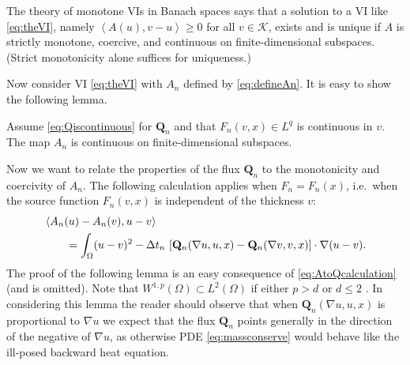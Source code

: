 \documentclass[final,onefignum]{siamart190516}
\newcommand\bQ{\mathbf{Q}}
\newcommand{\grad}{\nabla}
\newcommand{\ip}[2]{\ensuremath{\left<#1,#2\right>}}
\newcommand\RR{\mathbb{R}}
\begin{document}
The theory of monotone VIs in Banach spaces \cite[chapter III]{KinderlehrerStampacchia1980} says that a solution to a VI like \eqref{eq:theVI}, namely $\ip{A(u)}{v-u} \ge 0$ for all $v\in\mathcal{K}$, exists and is unique if $A$ is strictly monotone, coercive, and continuous on finite-dimensional subspaces.  (Strict monotonicity alone suffices for uniqueness.)

Now consider VI \eqref{eq:theVI} with $A_n$ defined by \eqref{eq:defineAn}.  It is easy to show the following lemma.

\begin{lemma}  \label{lem:continuous}  Assume \eqref{eq:Qiscontinuous} for $\bQ_n$ and that $F_n(v,x)\in L^q$ is continuous in $v$.  The map $A_n$ is continuous on finite-dimensional subspaces.
\end{lemma}


Now we want to relate the properties of the flux $\bQ_n$ to the monotonicity and coercivity of $A_n$.  The following calculation applies when $F_n=F_n(x)$, i.e.~when the source function $F_n(v,x)$ is independent of the thickness $v$:
\begin{align}
   &\ip{A_n(u) - A_n(v)}{u-v}  \label{eq:AtoQcalculation} \\
   &\qquad = \int_\Omega (u-v)^2 - \Delta t_n\, \left[\bQ_n(\grad u,u,x) - \bQ_n(\grad v,v,x)\right] \cdot \grad(u-v).  \notag
\end{align}
The proof of the following lemma is an easy consequence of \eqref{eq:AtoQcalculation} (and is omitted).  Note that $W^{1,p}(\Omega) \subset L^2(\Omega)$ if either $p>d$ or $d\le 2$ \cite[theorems 5.6.2 and 5.6.5]{Evans2010}.  In considering this lemma the reader should observe that when $\bQ_n(\grad u,u,x)$ is proportional to $\grad u$ we expect that the flux $\bQ_n$ points generally in the direction of the negative of $\grad u$, as otherwise PDE \eqref{eq:massconserve} would behave like the ill-posed backward heat equation.
\end{document}
